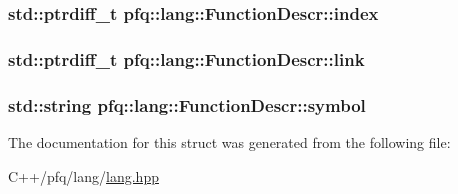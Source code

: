 \subsubsection[{\texorpdfstring{index}{index}}]{\setlength{\rightskip}{0pt plus 5cm}std\+::ptrdiff\+\_\+t pfq\+::lang\+::\+Function\+Descr\+::index}\hypertarget{structpfq_1_1lang_1_1FunctionDescr_ae818027f48319f8f4f59d3c47202d883}{}\label{structpfq_1_1lang_1_1FunctionDescr_ae818027f48319f8f4f59d3c47202d883}
\subsubsection[{\texorpdfstring{link}{link}}]{\setlength{\rightskip}{0pt plus 5cm}std\+::ptrdiff\+\_\+t pfq\+::lang\+::\+Function\+Descr\+::link}\hypertarget{structpfq_1_1lang_1_1FunctionDescr_a09e00f9d57300893f95661b56e6b114e}{}\label{structpfq_1_1lang_1_1FunctionDescr_a09e00f9d57300893f95661b56e6b114e}
\subsubsection[{\texorpdfstring{symbol}{symbol}}]{\setlength{\rightskip}{0pt plus 5cm}std\+::string pfq\+::lang\+::\+Function\+Descr\+::symbol}\hypertarget{structpfq_1_1lang_1_1FunctionDescr_a21f51c65f55dddd54de1171d8914c030}{}\label{structpfq_1_1lang_1_1FunctionDescr_a21f51c65f55dddd54de1171d8914c030}


The documentation for this struct was generated from the following file\+:\begin{DoxyCompactItemize}
\item 
C++/pfq/lang/\hyperlink{lang_8hpp}{lang.\+hpp}\end{DoxyCompactItemize}
